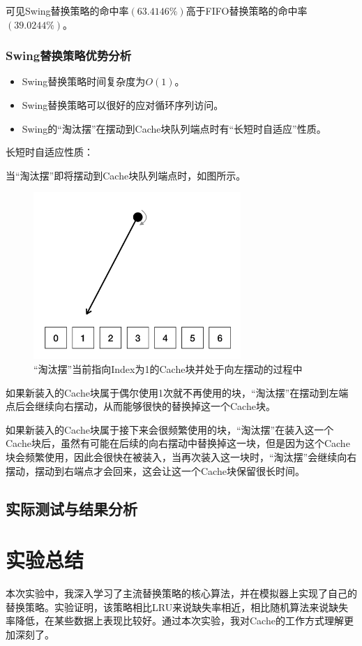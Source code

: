 \documentclass{article}
\begin{document}
可见Swing替换策略的命中率$(63.4146\%)$高于FIFO替换策略的命中率$(39.0244\%)$。

\subsubsection{Swing替换策略优势分析}
\begin{itemize}
	\item{Swing替换策略时间复杂度为$O(1)$。}
	\item{Swing替换策略可以很好的应对循环序列访问。}
	\item{Swing的“淘汰摆”在摆动到Cache块队列端点时有“长短时自适应”性质。}
\end{itemize}
长短时自适应性质：

当“淘汰摆”即将摆动到Cache块队列端点时，如图所示。
\begin{figure}[H]
    \centering
    \includegraphics[width=0.7\textwidth]{pic5.png}
    \caption{“淘汰摆”当前指向Index为1的Cache块并处于向左摆动的过程中}
\end{figure}
如果新装入的Cache块属于偶尔使用1次就不再使用的块，“淘汰摆”在摆动到左端点后会继续向右摆动，从而能够很快的替换掉这一个Cache块。

如果新装入的Cache块属于接下来会很频繁使用的块，“淘汰摆”在装入这一个Cache块后，虽然有可能在后续的向右摆动中替换掉这一块，但是因为这个Cache块会频繁使用，因此会很快在被装入，当再次装入这一块时，“淘汰摆”会继续向右摆动，摆动到右端点才会回来，这会让这一个Cache块保留很长时间。


\subsection{实际测试与结果分析}





\section{实验总结}
本次实验中，我深入学习了主流替换策略的核心算法，并在模拟器上实现了自己的替换策略。实验证明，该策略相比LRU来说缺失率相近，相比随机算法来说缺失率降低，在某些数据上表现比较好。通过本次实验，我对Cache的工作方式理解更加深刻了。
\end{document}
